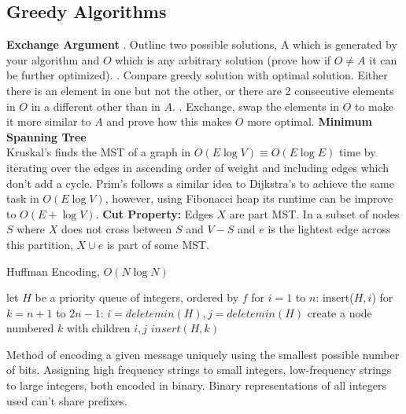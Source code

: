 \documentclass{article}
\begin{document}
\begin{multicols}{2}
\section*{Greedy Algorithms}
\textbf{Exchange Argument} . Outline two possible solutions, A which is generated by your algorithm and $O$ which is any arbitrary solution (prove how if $O \neq A$ it can be further optimized). . Compare greedy solution with optimal solution. Either there is an element in one but not the other, or there are 2 consecutive elements in $O$ in a different other than in $A$. . Exchange, swap the elements in $O$ to make it more similar to $A$ and prove how this makes $O$ more optimal. \newline  \newline 
\textbf{Minimum Spanning Tree} \\
Kruskal's finds the MST of a graph in $O(E \log V) \equiv O(E \log E)$ time by iterating over the edges in ascending order of weight and including edges which don't add a cycle. Prim's follows a similar idea to Dijkstra's to achieve the same task in $O(E \log V)$, however, using Fibonacci heap its runtime can be improve to $O(E + \log V)$. \newline 
\textbf{Cut Property:} Edges $X$ are part MST. In a subset of nodes $S$ where $X$ does not cross between $S$ and $V-S$ and $e$ is the lightest edge across this partition, $X \cup e$ is part of some MST. 
\setlength{\textfloatsep}{0.1cm}
\begin{algorithm}[H]
\label{alg:quad}
\caption{Huffman Encoding, $O(N \log N)$}\label{euclid}
\begin{algorithmic}[1]
\State let $H$ be a priority queue of integers, ordered by $f$
\State for $i = 1$ to $n$: insert($H, i$)
\State for $k = n+1$ to $2n-1$: 
\Indent 
\State$i = deletemin(H), j = deletemin(H)$
\State create a node numbered $k$ with children $i, j$
\State $insert(H, k)$
\EndIndent
\end{algorithmic}
\end{algorithm}
\setlength{\floatsep}{0.0cm}
Method of encoding a given message uniquely using the smallest possible number of bits. Assigning high frequency strings to small integers, low-frequency strings to large integers, both encoded in binary. Binary representations of all integers used can't share prefixes. 
\setlength{\textfloatsep}{0.0cm}
\begin{algorithm}[H]

\end{algorithm}
\end{multicols}
\end{document}

